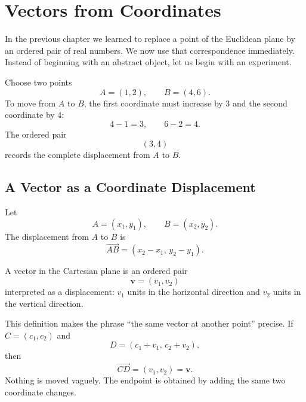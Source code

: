 \section{Vectors from Coordinates}

In the previous chapter we learned to replace a point of the Euclidean plane by
an ordered pair of real numbers.  We now use that correspondence immediately.
Instead of beginning with an abstract object, let us begin with an experiment.

Choose two points
\[
A=(1,2),
\qquad
B=(4,6).
\]
To move from $A$ to $B$, the first coordinate must increase by $3$ and the
second coordinate by $4$:
\[
4-1=3,
\qquad
6-2=4.
\]
The ordered pair
\[
(3,4)
\]
records the complete displacement from $A$ to $B$.

\subsection{A Vector as a Coordinate Displacement}

Let
\[
A=(x_1,y_1),
\qquad
B=(x_2,y_2).
\]
The displacement from $A$ to $B$ is
\[
\overrightarrow{AB}=(x_2-x_1,\,y_2-y_1).
\]

\begin{definitionbox}
A vector in the Cartesian plane is an ordered pair
\[
\mathbf v=(v_1,v_2)
\]
interpreted as a displacement: $v_1$ units in the horizontal direction and
$v_2$ units in the vertical direction.
\end{definitionbox}

This definition makes the phrase ``the same vector at another point'' precise.
If $C=(c_1,c_2)$ and
\[
D=(c_1+v_1,\,c_2+v_2),
\]
then
\[
\overrightarrow{CD}=(v_1,v_2)=\mathbf v.
\]
Nothing is moved vaguely.  The endpoint is obtained by adding the same two
coordinate changes.

\begin{center}
\end{center}

